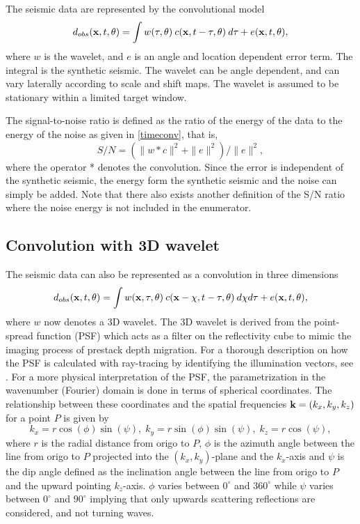 The seismic data are represented by the convolutional model
%
\begin{equation} \label{timeconv}
   d_{obs}(\mathbf{x},t,\theta)
    =\int w(\tau,\theta) \: c(\mathbf{x},t-\tau,\theta) \: d\tau + e(\mathbf{x},t,\theta),
\end{equation}
%
where $w$ is the wavelet, and $e$ is an angle and location dependent
error term. The integral is the synthetic seismic. The wavelet can be
angle dependent, and can vary laterally according to scale and shift
maps. The wavelet is assumed to be stationary within a limited 
target window. 

The signal-to-noise ratio is defined as the ratio of the energy of the
data to the energy of the noise as given in \autoref{timeconv}, that is, 
%
\begin{equation} \label{SNR}
   S/N =  \left(\| w * c\|^2+\| e\|^2\right) / \| e\|^2,
\end{equation}
%
\noindent
where the operator * denotes the convolution. Since the error is
independent of the synthetic seismic, the energy form the synthetic
seismic and the noise can simply be added. Note that there also exists
another definition of the S/N ratio where the noise energy is not
included in the enumerator.

\subsection{Convolution with 3D wavelet}
The seismic data can also be represented as a convolution in three dimensions 
%
\begin{equation} \label{3Dconv}
   d_{obs}(\mathbf{x},t,\theta)
    =\int w(\mathbf{x},\tau,\theta) \: c(\mathbf{x}-\mathbf{\chi},t-\tau,\theta) \: d\mathbf{\chi}d\tau + e(\mathbf{x},t,\theta),
\end{equation}
where $w$ now denotes a 3D wavelet. The 3D wavelet is derived from the point-spread function (PSF) which acts as a filter on the reflectivity cube to mimic the imaging process of prestack depth migration. For a thorough description on how the PSF is calculated with ray-tracing by identifying the illumination vectors, see \cite{lecomte08}. For a more physical interpretation of the PSF, the parametrization in the wavenumber (Fourier) domain is done in terms of spherical coordinates. The relationship between these coordinates and the spatial frequencies $\mathbf{k}=(k_x,
k_y, k_z)$ for a point $P$ is given by 
\begin{equation}
k_x=r\cos(\phi)\sin(\psi),\; k_y=r\sin(\phi)\sin(\psi),\; k_z=r\cos(\psi), \label{eq:spherical}
\end{equation}
where $r$ is the radial distance from origo to $P$, $\phi$ is the
azimuth angle between the line from origo to $P$ projected into the
$(k_x,k_y)$-plane and the $k_x$-axis and $\psi$ is the dip angle
defined as the inclination angle between the line from origo to $P$
and the upward pointing $k_z$-axis. $\phi$ varies between $0^{\circ}$
and $360^{\circ}$ while $\psi$ varies between $0^{\circ}$ and
$90^{\circ}$ implying that only upwards scattering reflections are
considered, and not turning waves. 

